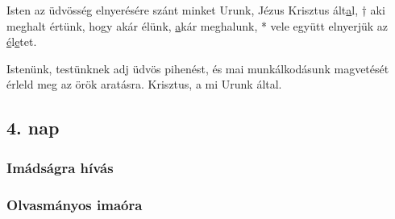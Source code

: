 \documentclass[twoside]{article}
\begin{document}
Isten az üdvösség elnyerésére szánt minket Urunk, Jézus Krisztus ált\underline{a}l, † aki meghalt
értünk, hogy akár élünk, \underline{a}kár meghalunk, * vele együtt elnyerjük az
\underline{é}l\underline{e}tet.

Istenünk, testünknek adj üdvös pihenést, és mai munkálkodásunk magvetését érleld meg az örök
aratásra. Krisztus, a mi Urunk által.

\subsection*{4. nap}

\subsubsection*{Imádságra hívás}

\subsubsection*{Olvasmányos imaóra}
\end{document}
